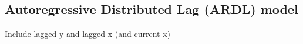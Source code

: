 
\subsection{Autoregressive Distributed Lag (ARDL) model}

Include lagged y and lagged x (and current x)

